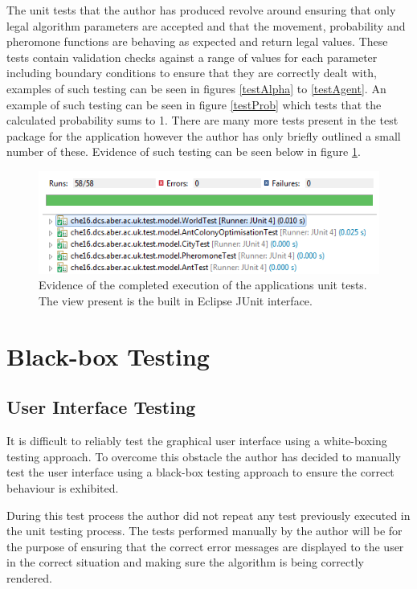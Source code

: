 The unit tests that the author has produced revolve around ensuring that only legal algorithm parameters are accepted and that the movement, probability and pheromone functions are behaving as expected and return legal values. These tests contain validation checks against a range of values for each parameter including boundary conditions to ensure that they are correctly dealt with, examples of such testing can be seen in figures \ref{testAlpha} to \ref{testAgent}. An example of such testing can be seen in figure \ref{testProb} which tests that the calculated probability sums to 1. There are many more tests present in the test package for the application however the author has only briefly outlined a small number of these. Evidence of such testing can be seen below in figure \ref{testSS}.

\begin{figure}[H]
\centering
\includegraphics[scale=0.8]{Images/chapter6/testSS}
\caption[Unit Testing Summary]{Evidence of the completed execution of the applications unit tests. The view present is the built in Eclipse JUnit interface.}
\label{testSS}
\end{figure}

\section{Black-box Testing}
\subsection{User Interface Testing}

It is difficult to reliably test the graphical user interface using a white-boxing testing approach. To overcome this obstacle the author has decided to manually test the user interface using a black-box testing approach to ensure the correct behaviour is exhibited.

During this test process the author did not repeat any test previously executed in the unit testing process. The tests performed manually by the author will be for the purpose of ensuring that the correct error messages are displayed to the user in the correct situation and making sure the algorithm is being correctly rendered.

